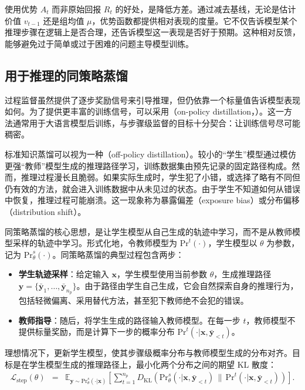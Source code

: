 使用优势 $A_t$ 而非原始回报 $R_t$ 的好处，是降低方差。通过减去基线，无论是估计价值 $v_{t-1}$ 还是组均值 $\mu$，优势函数都提供相对表现的度量。它不仅告诉模型某个推理步骤在逻辑上是否合理，还告诉模型这一表现是否好于预期。这种相对反馈，能够避免过于简单或过于困难的问题主导模型训练。

\subsection{用于推理的同策略蒸馏}

过程监督虽然提供了逐步奖励信号来引导推理，但仍依靠一个标量值告诉模型表现如何。为了提供更丰富的训练信号，可以采用（on-policy distillation，）。这一方法通常用于大语言模型后训练，与步骤级监督的目标十分契合：让训练信号尽可能稠密。

标准知识蒸馏可以视为一种（off-policy distillation）。较小的“学生”模型通过模仿更强“教师”模型生成的推理路径学习，训练数据集由预先记录的固定路径构成。然而，推理过程漫长且脆弱。如果实际生成时，学生犯了小错，或选择了略有不同但仍有效的方法，就会进入训练数据中从未见过的状态。由于学生不知道如何从错误中恢复，推理过程可能崩溃。这一现象称为暴露偏差（exposure bias）或分布偏移（distribution shift）。

同策略蒸馏的核心思想，是让学生模型从自己生成的轨迹中学习，而不是从教师模型采样的轨迹中学习。形式化地，令教师模型为 $\mathrm{Pr}^{t}(\cdot)$，学生模型以 $\theta$ 为参数，记为 $\mathrm{Pr}_{\theta}^{s}(\cdot)$。同策略蒸馏的典型过程包含两步：

\begin{itemize}
\item \vspace{0.5em} \textbf{学生轨迹采样}：给定输入 $\mathbf{x}$，学生模型使用当前参数 $\theta$，生成推理路径 $\mathbf{y} = \{\bar{\mathbf{y}}_1, \dots, \bar{\mathbf{y}}_{n_p}\}$。由于路径由学生自己生成，它会自然探索自身的推理行为，包括轻微偏离、采用替代方法，甚至犯下教师绝不会犯的错误。
\item \vspace{0.3em} \textbf{教师指导}：随后，将学生生成的路径输入教师模型。在每一步 $t$，教师模型不提供标量奖励，而是计算下一步的概率分布 $\mathrm{Pr}^{t}(\cdot | \mathbf{x}, \bar{\mathbf{y}}_{<t})$。
\end{itemize}
\vspace{0.5em}

理想情况下，更新学生模型，使其步骤级概率分布与教师模型生成的分布对齐。目标是在学生模型生成的推理路径上，最小化两个分布之间的期望 KL 散度：
\begin{eqnarray}\mathcal{L}_{\mathrm{step}}(\theta) & = & \mathbb{E}_{\mathbf{y} \sim \mathrm{Pr}_{\theta}^{s}(\cdot|\mathbf{x})} \left[ \sum_{t=1}^{n_p} D_{\mathrm{KL}} \left( \mathrm{Pr}_{\theta}^{s}(\cdot | \mathbf{x}, \bar{\mathbf{y}}_{<t}) \,\|\, \mathrm{Pr}^{t}(\cdot | \mathbf{x}, \bar{\mathbf{y}}_{<t}) \right) \right].
\end{eqnarray}

